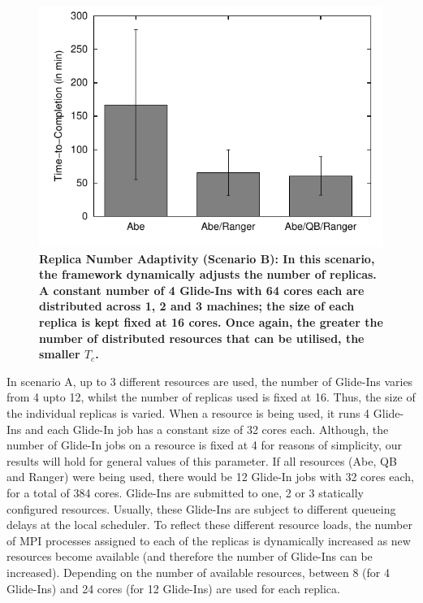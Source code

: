 \documentclass{rspublic}
\begin{document}
\begin{figure}[h]
\begin{minipage}[t]{.485\textwidth}
\begin{center}
      \includegraphics[width=\textwidth]{performance/perf_distributed_number_replica.pdf}
      \caption{\footnotesize \bf Replica Number Adaptivity (Scenario
        B): In this scenario, the framework dynamically adjusts the
        number of replicas.  A constant number of 4 Glide-Ins with 64
        cores each are distributed across 1, 2 and 3 machines; the
        size of each replica is kept fixed at 16 cores. Once again,
        the greater the number of distributed resources that can be
        utilised, the smaller $T_{c}$.}
      \label{fig:performance_perf_distributed_B}
    \end{center}
  \end{minipage}
  \hfill
\end{figure}

In scenario A, up to 3 different resources are used, the number of
Glide-Ins varies from 4 upto 12, whilst the number of replicas used is
fixed at 16. Thus, the size of the individual replicas is varied.
When a resource is being used, it runs 4 Glide-Ins and each Glide-In
job has a constant size of 32 cores each.  Although, the number of
Glide-In jobs on a resource is fixed at 4 for reasons of simplicity,
our results will hold for general values of this parameter. If all
resources (Abe, QB and Ranger) were being used, there would be 12
Glide-In jobs with 32 cores each, for a total of 384 cores.  Glide-Ins
are submitted to one, 2 or 3 statically configured resources. Usually,
these Glide-Ins are subject to different queueing delays at the local
scheduler. To reflect these different resource loads, the number of
MPI processes assigned to each of the replicas is dynamically
increased as new resources become available (and therefore the number
of Glide-Ins can be increased). Depending on the number of available
resources, between 8 (for 4 Glide-Ins) and 24 cores (for 12 Glide-Ins)
are used for each replica.
\end{document}
